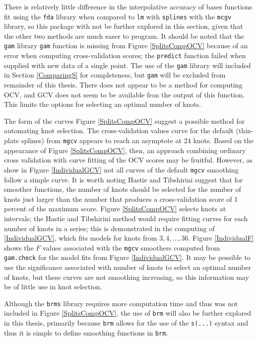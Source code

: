 \documentclass[phdcss]{SDSUThesis}
\begin{document}
There is relatively little difference in the interpolative accuracy of bases functions fit using the \texttt{fda} library when compared to \texttt{lm} with \texttt{splines} with the \texttt{mcgv} library, so this package with not be further explored in this section, given that the other two methods are much easer to program. It should be noted that the \texttt{gam} library \texttt{gam} function is missing from Figure \ref{SplitsCompOCV} because of an error when computing cross-validation scores; the \texttt{predict} function failed when supplied with new data of a single point. The use of the \texttt{gam} library will included in Section \ref{ComparingS} for completeness, but \texttt{gam} will be excluded from remainder of this thesis. There does not appear to be a method for computing OCV, and GCV does not seem to be available fron the output of this function. This limits the options for selecting an optimal number of knots.


The form of the curves Figure \ref{SplitsCompOCV} suggest a possible method for automating knot selection. The cross-validation values curve for the default (thin-plate splines) from \texttt{mgcv} appears to reach an asymptote at 24 knots. Based on the appearance of Figure \ref{SplitsCompOCV}, then, an approach combining ordinary cross validation with curve fitting of the OCV scores may be fruitful. However, as show in Figure \ref{IndividualGCV} not all curves of the default \texttt{mgcv} smoothing follow a simple curve. It is worth noting Hastie and Tibshirini suggest that for smoother functions, the number of knots should be selected for the number of knots just larger than the number that produces a cross-validation score of 1 percent of the maximum score. Figure \ref{SplitsCompOCV} selects knots at intervals; the Hastie and Tibshirini method would require fitting curves for each number of knots in a series; this is demonstrated in the computing of \ref{IndividualGCV}, which fits models for knots from ${3,4,\dots,36}$. Figure \ref{IndividualF} shows the $F$ values associated with the \texttt{mgcv} smoothers computed from \texttt{gam.check} for the model fits from Figure \ref{IndividualGCV}. It may be possible to use the significance associated with number of knots to select an optimal number of knots, but these curves are not smoothing increasing, so this information may be of little use in knot selection.

Although the \texttt{brms} library requires more computation time and thus was not included in Figure \ref{SplitsCompOCV}, the use of \texttt{brm} will also be further explored in this thesis, primarily because \texttt{brm} allows for the use of the \texttt{s(...)} syntax and thus it is simple to define smoothing functions in \texttt{brm}.
\end{document}
